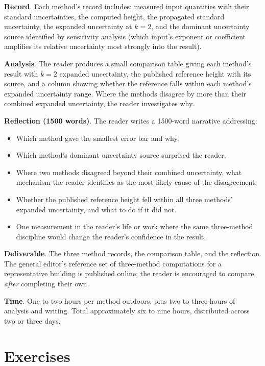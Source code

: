 \begin{project}
\textbf{Record}. Each method's record includes: measured input
quantities with their standard uncertainties, the computed height,
the propagated standard uncertainty, the expanded uncertainty at
$k = 2$, and the dominant uncertainty source identified by
sensitivity analysis (which input's exponent or coefficient amplifies
its relative uncertainty most strongly into the result).

\textbf{Analysis}. The reader produces a small comparison table
giving each method's result with $k = 2$ expanded uncertainty,
the published reference height with its source, and a column
showing whether the reference falls within each method's expanded
uncertainty range. Where the methods disagree by more than their
combined expanded uncertainty, the reader investigates why.

\textbf{Reflection (1500 words)}. The reader writes a 1500-word
narrative addressing:

\begin{itemize}[leftmargin=*]
  \item Which method gave the smallest error bar and why.
  \item Which method's dominant uncertainty source surprised the
    reader.
  \item Where two methods disagreed beyond their combined
    uncertainty, what mechanism the reader identifies as the most
    likely cause of the disagreement.
  \item Whether the published reference height fell within all
    three methods' expanded uncertainty, and what to do if it
    did not.
  \item One measurement in the reader's life or work where the
    same three-method discipline would change the reader's
    confidence in the result.
\end{itemize}

\textbf{Deliverable}. The three method records, the comparison
table, and the reflection. The general editor's reference set of
three-method computations for a representative building is
published online; the reader is encouraged to compare \emph{after}
completing their own.

\textbf{Time}. One to two hours per method outdoors, plus two to
three hours of analysis and writing. Total approximately six to
nine hours, distributed across two or three days.
\end{project}

\section{Exercises}

